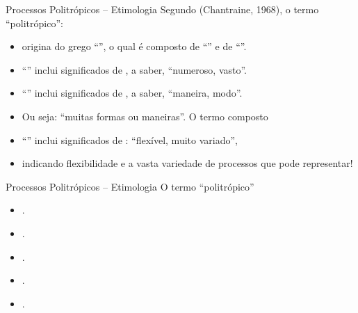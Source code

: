     \begin{frame}{Processos Politrópicos -- Etimologia}\vspace*{-2em}
        Segundo (Chantraine, 1968), o termo ``politrópico'': \\[\medskipamount]
        \begin{itemize}
            \item<1-> origina do grego \alert{``''}, o qual é composto de
                \alert{``''} e de \alert{``''}. \\[\medskipamount]
            \item<2-> \alert{``''} inclui significados de , a saber, ``numeroso, vasto''. \\[\medskipamount]
            \item<3-> \alert{``''} inclui significados de , a saber, ``maneira, modo''. \\[\medskipamount]
            \item<4-> Ou seja: \alert{``muitas formas ou maneiras''}. O termo composto
                \\[\medskipamount]
            \item<5-> \alert{``''} inclui significados de : ``flexível, muito variado'', \\[\medskipamount]
            \item<6-> indicando \alert{flexibilidade} e a vasta \alert{variedade} de processos
                que pode representar!
        \end{itemize}
    \end{frame}

    \begin{frame}{Processos Politrópicos -- Etimologia}\vspace*{-2em}
        O termo ``politrópico''
        \begin{itemize}
            \item . \\[\medskipamount]
            \item . \\[\medskipamount]
            \item . \\[\medskipamount]
            \item . \\[\medskipamount]
            \item .
        \end{itemize}
    \end{frame}

